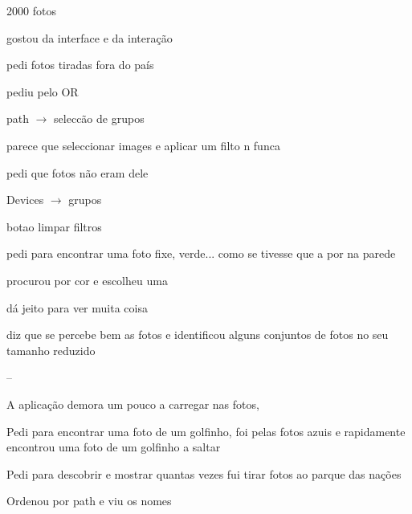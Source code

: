 \begin{myitemize}

	\item 2000 fotos

	\item gostou da interface e da interação


	\item pedi fotos tiradas fora do país

	\item pediu pelo OR

	\item path $\rightarrow$ seleccão de grupos



	\item parece que seleccionar images e aplicar um filto n funca



	\item pedi que fotos não eram dele

	\item Devices $\rightarrow$ grupos


	\item botao limpar filtros


	\item pedi para encontrar uma foto fixe, verde... como se tivesse que a por na parede

	\item procurou por cor e escolheu uma


	\item dá jeito para ver muita coisa

	\item diz que se percebe bem as fotos e identificou alguns conjuntos de fotos no seu tamanho reduzido


	\item --


	\item A aplicação demora um pouco a carregar nas fotos, 


	\item Pedi para encontrar uma foto de um golfinho, foi pelas fotos azuis e rapidamente encontrou uma foto de um golfinho a saltar


	\item Pedi para descobrir e mostrar quantas vezes fui tirar fotos ao parque das nações

	\item Ordenou por path e viu os nomes




\end{myitemize}
